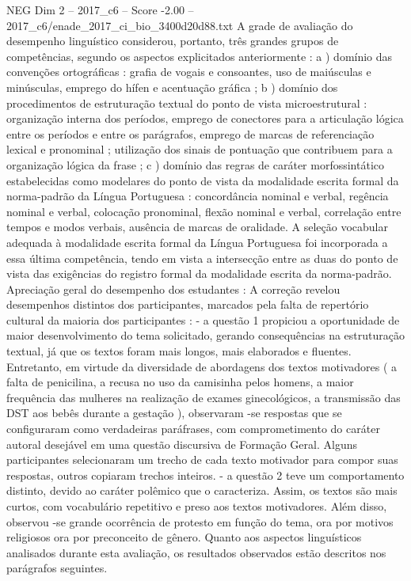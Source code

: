 \begin{textsample}{NEG Dim 2 – 2017\_c6 – Score -2.00 – 2017\_c6/enade\_2017\_ci\_bio\_3400d20d88.txt}
A grade de avaliação do desempenho linguístico considerou, portanto, três grandes grupos de competências, segundo os aspectos explicitados anteriormente : a ) domínio das convenções ortográficas : grafia de vogais e consoantes, uso de maiúsculas e minúsculas, emprego do hífen e acentuação gráfica ; b ) domínio dos procedimentos de estruturação textual do ponto de vista microestrutural : organização interna dos períodos, emprego de conectores para a articulação lógica entre os períodos e entre os parágrafos, emprego de marcas de referenciação lexical e pronominal ; utilização dos sinais de pontuação que contribuem para a organização lógica da frase ; c ) domínio das regras de caráter morfossintático estabelecidas como modelares do ponto de vista da modalidade escrita formal da norma-padrão da Língua Portuguesa : concordância nominal e verbal, regência nominal e verbal, colocação pronominal, flexão nominal e verbal, correlação entre tempos e modos verbais, ausência de marcas de oralidade.
A seleção vocabular adequada à modalidade escrita formal da Língua Portuguesa foi incorporada a essa última competência, tendo em vista a intersecção entre as duas do ponto de vista das exigências do registro formal da modalidade escrita da norma-padrão.
Apreciação geral do desempenho dos estudantes : A correção revelou desempenhos distintos dos participantes, marcados pela falta de repertório cultural da maioria dos participantes : - a questão 1 propiciou a oportunidade de maior desenvolvimento do tema solicitado, gerando consequências na estruturação textual, já que os textos foram mais longos, mais elaborados e fluentes.
Entretanto, em virtude da diversidade de abordagens dos textos motivadores ( a falta de penicilina, a recusa no uso da camisinha pelos homens, a maior frequência das mulheres na realização de exames ginecológicos, a transmissão das DST aos bebês durante a gestação ), observaram -se respostas que se configuraram como verdadeiras paráfrases, com comprometimento do caráter autoral desejável em uma questão discursiva de Formação Geral.
Alguns participantes selecionaram um trecho de cada texto motivador para compor suas respostas, outros copiaram trechos inteiros. - a questão 2 teve um comportamento distinto, devido ao caráter polêmico que o caracteriza.
Assim, os textos são mais curtos, com vocabulário repetitivo e preso aos textos motivadores.
Além disso, observou -se grande ocorrência de protesto em função do tema, ora por motivos religiosos ora por preconceito de gênero.
Quanto aos aspectos linguísticos analisados durante esta avaliação, os resultados observados estão descritos nos parágrafos seguintes.

\end{textsample}
